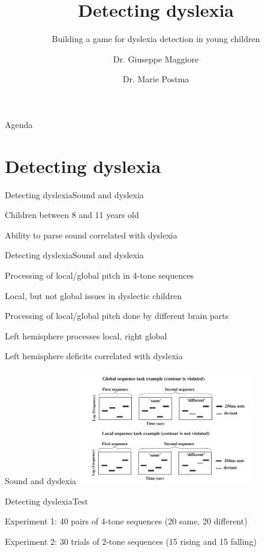 \documentclass{beamer}
\title{Detecting dyslexia}
\subtitle{Building a game for dyslexia detection in young children}
\author{Dr. Giuseppe Maggiore \and Dr. Marie Postma}
\institute{NHTV University of Applied Sciences \\ 
Breda, Netherlands}
\date{}
\begin{document}
\maketitle

\begin{frame}{Agenda}
\tableofcontents
\end{frame}

\section{Detecting dyslexia}
\begin{slide}{Detecting dyslexia}{Sound and dyslexia}{
\item Children between 8 and 11 years old \cite{LOCAL_GLOBAL_DYSLEXIA}
\item Ability to parse sound correlated with dyslexia
}\end{slide}

\begin{slide}{Detecting dyslexia}{Sound and dyslexia}{
\item Processing of local/global pitch in 4-tone sequences
\item Local, but not global issues in dyslectic children
\item Processing of local/global pitch done by different brain parts
\item Left hemisphere processes local, right global
\item Left hemisphere deficits correlated with dyslexia
}\end{slide}

\begin{frame}{Sound and dyslexia}
\center
\includegraphics[height=5cm]{Pics/local_global.png}
\end{frame}

\begin{slide}{Detecting dyslexia}{Test}{
\item Experiment 1: 40 pairs of 4-tone sequences (20 same, 20 different)
\item Experiment 2: 30 trials of 2-tone sequences (15 rising and 15 falling)
}\end{slide}
\end{document}
